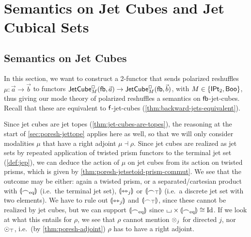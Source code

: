 \documentclass[a4paper]{memoir}
\begin{document}
\section{Semantics on Jet Cubes and Jet Cubical Sets} \label{sec:poresh-jetcube-jcset}

\subsection{Semantics on Jet Cubes} \label{sec:poresh-jetcube}
In this section, we want to construct a 2-functor that sends polarized reshuffles $\mu : \vec a \to \vec b$ to functors $\mathsf{JetCube}^{\Box}_{M}({\mathsf{fb}},\vec a) \to \mathsf{JetCube}^{\Box}_{M}({\mathsf{fb}},\vec b)$, with $M \in \mathopen{}\left\{ {\mathsf{IPt}_2}, \mathsf{Boo} \right\}\mathclose{}$, thus giving our mode theory of polarized reshuffles a semantics on ${\mathsf{fb}}$-jet-cubes.
Recall that these are equivalent to ${\mathsf{f}}$-jet-cubes (\cref{thm:backward-jets-equivalent}).

Since jet cubes are jet topes (\cref{thm:jet-cubes-are-topes}), the reasoning at the start of \cref{sec:poresh-jettope} applies here as well, so that we will only consider modalities $\mu$ that have a right adjoint $\mu \dashv \rho$.
Since jet cubes are realized as jet sets by repeated application of twisted prism functors to the terminal jet set (\cref{def:jep}), we can deduce the action of $\mu$ on jet cubes from its action on twisted prisms, which is given by \cref{thm:poresh-jetsetoid-prism-commut}.
We see that the outcome may be either: again a twisted prism, or a separated/cartesian product with ${\llparenthesis {\frown}_{\mathrm{eq}} \rrparenthesis}$ (i.e.\ the terminal jet set), ${\llparenthesis \leftrightarrowtriangle_j \rrparenthesis}$ or ${\llparenthesis {\frown}_\top \rrparenthesis}$ (i.e.\ a discrete jet set with two elements).
We have to rule out ${\llparenthesis \leftrightarrowtriangle_j \rrparenthesis}$ and ${\llparenthesis {\frown}_\top \rrparenthesis}$, since these cannot be realized by jet cubes, but we can support ${\llparenthesis {\frown}_{\mathrm{eq}} \rrparenthesis}$ since ${\llcorner\hspace{-.4ex}\lrcorner} \times {\llparenthesis {\frown}_{\mathrm{eq}}\rrparenthesis} \cong \mathrm{Id}$.
If we look at what this entails for $\rho$, we see that $\rho$ cannot mention ${\otimes}_j$ for directed $j$, nor ${\odot}_\top$, i.e.\ (by \cref{thm:poresh-adjoint}) $\rho$ has to have a right adjoint.
\end{document}
